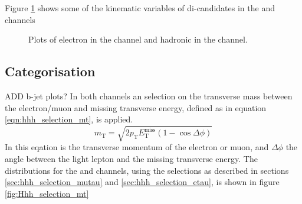 Figure \ref{fig:Hhh_selection_kinematics_etmt} shows some of the kinematic variables 
of di-\Pgt candidates in the \etau and \mutau channels
\begin{figure}[h!]
\begin{center}

\end{center}
\caption{Plots of electron \pT in the \etau channel and hadronic \Pgt \pT in the \mutau channel.}
\label{fig:Hhh_selection_kinematics_etmt}
\end{figure}


\subsection{Categorisation}
\label{sec:hhh_selection_categories}
ADD b-jet plots?
In both channels an selection on the transverse mass \mT between the electron/muon
and missing transverse energy, defined as in equation \ref{eqn:hhh_selection_mt}, is applied.
\begin{equation}\label{eqn:hhh_selection_mt}
m_{\text{T}} = \sqrt{2p_{\text{T}}E_{\text{T}}^{\text{miss}}(1-\cos{\Delta\phi})}
\end{equation}
In this eqation \pT is the transverse momentum of the electron or muon, and $\Delta\phi$ the angle
between the light lepton and the missing transverse energy. The \mT distributions for the \etau
and \mutau channels, using the selections as
described in sections \ref{sec:hhh_selection_mutau} and \ref{sec:hhh_selection_etau},
is shown in figure \ref{fig:Hhh_selection_mt}

